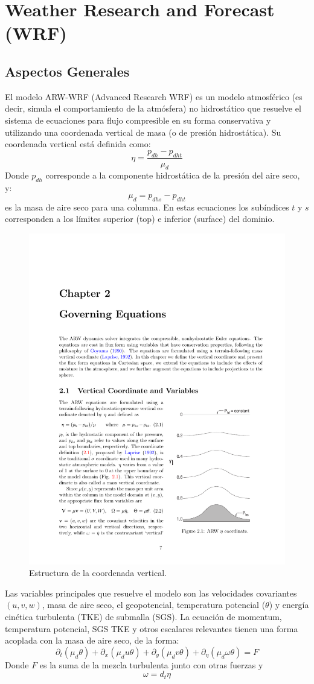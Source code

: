 \chapter{Weather Research and Forecast (WRF)}
\section{Aspectos Generales}
El modelo ARW-WRF (Advanced Research WRF) es un modelo atmosférico (es decir, simula el comportamiento de la atmósfera) no hidrostático que resuelve el sistema de ecuaciones para flujo compresible en su forma conservativa y utilizando una coordenada vertical de masa (o de presión hidrostática). Su coordenada vertical está definida como:
\begin{equation}
\eta = \frac{p_{dh}-p_{dht}}{\mu_d}
\end{equation}
Donde $p_{dh}$ corresponde a la componente hidrostática de la presión del aire seco, y:
\begin{equation}
\mu_d = p_{dhs} - p_{dht}
\end{equation}
es la masa de aire seco para una columna. En estas ecuaciones los subíndices $t$ y $s$ corresponden a los límites superior (top) e inferior (surface) del dominio. 

\begin{figure}[h!]
	\centering
	\includegraphics[width=0.55\linewidth,trim={11.5cm 3.3cm 1cm 14cm},clip]{Imagenes/eta}
	\caption{Estructura de la coordenada vertical.}
	\label{fig:eta}
\end{figure}

Las variables principales que resuelve el modelo son las velocidades covariantes $(u,v,w)$, masa de aire seco, el geopotencial, temperatura potencial ($\theta$) y energía cinética turbulenta (TKE) de submalla (SGS). La ecuación de momentum, temperatura potencial, SGS TKE y otros escalares relevantes tienen una forma acoplada con la masa de aire seco, de la forma:
\begin{equation}\label{eq:ec_conervacion}
\partial_t (\mu_d\theta) + \partial_x(\mu_d u \theta)+\partial_y(\mu_d v \theta)+\partial_\eta (\mu_d \omega \theta) = F
\end{equation}
Donde $F$ es la suma de la mezcla turbulenta junto con otras fuerzas y
\begin{equation}
\omega = d_t\eta
\end{equation}

